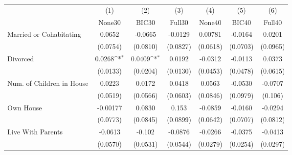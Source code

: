 {
\def\sym#1{\ifmmode^{#1}\else\(^{#1}\)\fi}
\begin{tabular}{l*{6}{c}}
\toprule
            &\multicolumn{1}{c}{(1)}&\multicolumn{1}{c}{(2)}&\multicolumn{1}{c}{(3)}&\multicolumn{1}{c}{(4)}&\multicolumn{1}{c}{(5)}&\multicolumn{1}{c}{(6)}\\
            &\multicolumn{1}{c}{None30}&\multicolumn{1}{c}{BIC30}&\multicolumn{1}{c}{Full30}&\multicolumn{1}{c}{None40}&\multicolumn{1}{c}{BIC40}&\multicolumn{1}{c}{Full40}\\
\midrule
Married or Cohabitating&      0.0652         &     -0.0665         &     -0.0129         &     0.00781         &     -0.0164         &      0.0201         \\
            &    (0.0754)         &    (0.0810)         &    (0.0827)         &    (0.0618)         &    (0.0703)         &    (0.0965)         \\
\addlinespace
Divorced    &      0.0268\sym{*}  &      0.0409\sym{*}  &      0.0192         &     -0.0312         &     -0.0113         &      0.0373         \\
            &    (0.0133)         &    (0.0204)         &    (0.0130)         &    (0.0453)         &    (0.0478)         &    (0.0615)         \\
\addlinespace
Num. of Children in House&      0.0223         &      0.0172         &      0.0418         &      0.0563         &     -0.0530         &     -0.0707         \\
            &    (0.0519)         &    (0.0566)         &    (0.0603)         &    (0.0846)         &    (0.0979)         &     (0.106)         \\
\addlinespace
Own House   &    -0.00177         &      0.0830         &       0.153         &     -0.0859         &     -0.0160         &     -0.0294         \\
            &    (0.0773)         &    (0.0845)         &    (0.0899)         &    (0.0642)         &    (0.0707)         &    (0.0812)         \\
\addlinespace
Live With Parents&     -0.0613         &      -0.102         &     -0.0876         &     -0.0266         &     -0.0375         &     -0.0413         \\
            &    (0.0570)         &    (0.0531)         &    (0.0544)         &    (0.0279)         &    (0.0254)         &    (0.0297)         \\
\bottomrule
\end{tabular}
}

